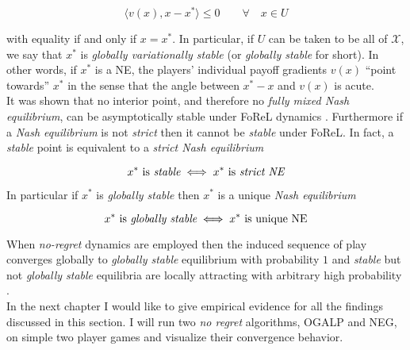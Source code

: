 \begin{equation}
    \langle v(x),x-x^*\rangle \le 0 \qquad \forall \quad x \in U
\end{equation}

with equality if and only if $x = x^*$. In particular, if $U$ can be taken to be all of $\mathcal{X}$, we say that $x^*$ is \textit{globally variationally stable} (or \textit{globally stable} for short). In other words, if $x^*$ is a NE, the players’ individual payoff gradients $v(x)$ “point towards” $x^*$ in the sense that the angle between $x^* - x$ and $v(x)$ is acute. \\

It was shown that no interior point, and therefore no \textit{fully mixed Nash equilibrium}, can be asymptotically stable under FoReL dynamics \cite[Theorem 1]{flokas}. Furthermore if a \textit{Nash equilibrium} is not \textit{strict} then it cannot be \textit{stable} under FoReL. In fact, a \textit{stable} point is equivalent to a \textit{strict Nash equilibrium} \cite[Prop. 5.2]{mertikopoulos}

\begin{equation}\centering
    x^* \text{ is } \textit{stable} \iff x^* \text{ is } \textit{strict NE}
\end{equation}

In particular if $x^*$ is \textit{globally stable} then $x^*$ is a unique \textit{Nash equilibrium}

\begin{equation}\centering
    x^* \text{ is } \textit{globally stable} \iff x^* \text{ is unique NE}
\end{equation}

When \textit{no-regret} dynamics are employed then the induced sequence of play converges globally to \textit{globally stable} equilibrium with probability $1$ \cite[Theorem 4.7]{mertikopoulos} and \textit{stable}  but not \textit{globally stable} equilibria are locally attracting with arbitrary high probability \cite[Theorem 4.11]{mertikopoulos}. \\

In the next chapter I would like to give empirical evidence for all the findings discussed in this section. I will run two \textit{no regret} algorithms, OGALP and NEG, on simple two player games and visualize their convergence behavior. 


